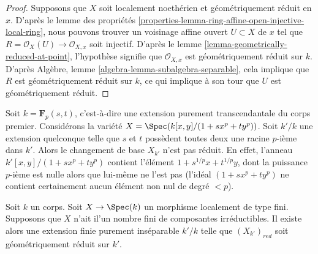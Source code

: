 \begin{proof}
Supposons que $X$ soit localement noethérien et
géométriquement réduit en $x$. D'après le lemme des
propriétés
\ref{properties-lemma-ring-affine-open-injective-local-ring}, nous
pouvons trouver un voisinage affine ouvert $U \subset X$ de $x$
tel que $R = \mathcal{O}_X(U) \to \mathcal{O}_{X, x}$ soit
injectif. D'après le lemme \ref{lemma-geometrically-reduced-at-point},
l'hypothèse signifie que $\mathcal{O}_{X, x}$ est géométriquement
réduit sur $k$. D'après Algèbre, lemme
\ref{algebra-lemma-subalgebra-separable}, cela implique que $R$ est
géométriquement réduit sur $k$, ce qui implique à son tour que $U$ est géométriquement réduit.
\end{proof}

\begin{example}
\label{example-not-geometrically-reduced}
Soit $k = \mathbf{F}_p(s, t)$, c'est-à-dire une
extension purement transcendantale du corps premier.
Considérons la variété $X = \Spec(k[x, y]/(1 + sx^p +
ty^p))$. Soit $k'/k$ une extension quelconque telle que $s$
et $t$ possèdent toutes deux une racine $p$-ième dans $k'$.
Alors le changement de base $X_{k'}$ n'est pas réduit. En
effet, l'anneau $k'[x, y]/(1 + s x^p + ty^p)$ contient
l'élément $1 + s^{1/p}x + t^{1/p}y$, dont la puissance $p$-ième est
nulle alors que lui-même ne l'est pas (l'idéal $(1 + sx^p + ty^p)$
ne contient certainement aucun élément non nul de degré $< p$).
\end{example}

\begin{lemma}
\label{lemma-finite-extension-geometrically-reduced}
Soit $k$ un corps. Soit $X \to \Spec(k)$ un morphisme
localement de type fini. Supposons que $X$ n'ait il'un nombre
fini de composantes irréductibles. Il existe alors une
extension finie purement inséparable $k'/k$ telle que
$(X_{k'})_{red}$ soit géométriquement réduit sur $k'$.
\end{lemma}

